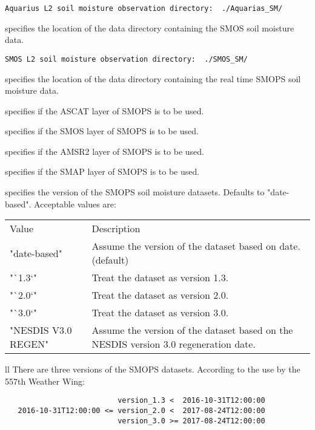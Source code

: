  \begin{Verbatim}[frame=single]
Aquarius L2 soil moisture observation directory:  ./Aquarias_SM/
 \end{Verbatim}

 
 specifies the location of the data directory containing the SMOS 
 soil moisture data.
 

 \begin{Verbatim}[frame=single]
SMOS L2 soil moisture observation directory:  ./SMOS_SM/
 \end{Verbatim}

 
 specifies the location of the data directory containing the real time
 SMOPS soil moisture data.

 specifies if the ASCAT layer of SMOPS is to be used.

 specifies if the SMOS layer of SMOPS is to be used.

 specifies if the AMSR2 layer of SMOPS is to be used.

 specifies if the SMAP layer of SMOPS is to be used.

  specifies the version of the SMOPS
 soil moisture datasets.
 Defaults to "date-based".
 Acceptable values are:

 \begin{tabular}{ll}
 Value               & Description \\
 "date-based"        & Assume the version of the dataset based on date.
                       (default) \\
 "`1.3`"             & Treat the dataset as version 1.3. \\
 "`2.0`"             & Treat the dataset as version 2.0. \\
 "`3.0`"             & Treat the dataset as version 3.0. \\
 "NESDIS V3.0 REGEN" & Assume the version of the dataset based on the
                       NESDIS version 3.0 regeneration date. \\
 \end{tabular}{ll}
 There are three versions of the SMOPS datasets.  According to the
 use by the 557th Weather Wing:
 

 \begin{verbatim}
                          version_1.3 <  2016-10-31T12:00:00
   2016-10-31T12:00:00 <= version_2.0 <  2017-08-24T12:00:00
                          version_3.0 >= 2017-08-24T12:00:00
 
 \end{verbatim}

